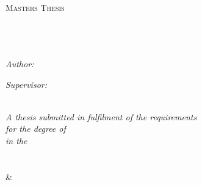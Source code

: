 \documentclass[11pt, oneside]{Thesis} %
\begin{document}
\begin{titlepage}
    \begin{center}

        \textsc{\LARGE \univname}\\[1.5cm] %
        \textsc{\Large Masters Thesis}\\[0.5cm] %

        \HRule \\[0.4cm] %
        {\huge \bfseries \ttitle}\\[0.4cm] %
        \HRule \\[1.5cm] %

        \begin{minipage}{0.4\textwidth}
            \begin{flushleft} \large
                \emph{Author:}\\
                \href{http://www.johnsmith.com}{\authornames} %
            \end{flushleft}
        \end{minipage}
        \begin{minipage}{0.4\textwidth}
            \begin{flushright} \large
                \emph{Supervisor:} \\
                \href{http://www.jamessmith.com}{\supname} %
            \end{flushright}
        \end{minipage}\\[3cm]

        \large \textit{A thesis submitted in fulfilment of the requirements\\ for the degree of \degreename}\\[0.3cm] %
        \textit{in the}\\[0.4cm]

        \deptnamefirst\\[0.4cm] %


        \deptnamesecond\\[0.4cm] %

        \&

        \groupname\\[1.5cm]


\end{center}
\end{titlepage}
\end{document}
